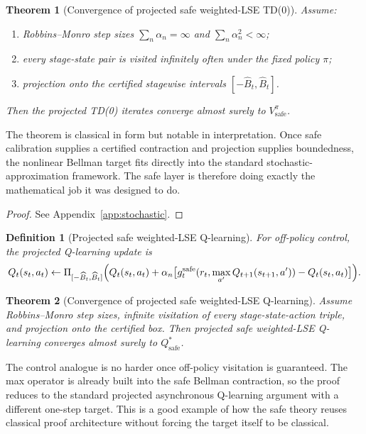 \documentclass{article}
\newtheorem{theorem}{Theorem}[section]
\newtheorem{definition}[definition]{Definition}
\theoremstyle{remark}
\newcommand{\safe}{\mathrm{safe}}
\newcommand{\Bhat}{\widehat B}
\begin{document}
\begin{theorem}[Convergence of projected safe weighted-LSE TD(0)]
\label{thm:td0-convergence}
Assume:
\begin{enumerate}[label=(\roman*),leftmargin=1.5em,itemsep=2pt]
    \item Robbins--Monro step sizes $\sum_n \alpha_n=\infty$ and $\sum_n \alpha_n^2<\infty$;
    \item every stage-state pair is visited infinitely often under the fixed policy $\pi$;
    \item projection onto the certified stagewise intervals $[-\Bhat_t,\Bhat_t]$.
\end{enumerate}
Then the projected TD(0) iterates converge almost surely to $V_\safe^\pi$.
\end{theorem}

The theorem is classical in form but notable in interpretation.
Once safe calibration supplies a certified contraction and projection supplies boundedness, the nonlinear Bellman target fits directly into the standard stochastic-approximation framework.
The safe layer is therefore doing exactly the mathematical job it was designed to do.

\begin{proof}
See Appendix~\ref{app:stochastic}.
\end{proof}

\begin{definition}[Projected safe weighted-LSE Q-learning]
\label{def:lse-q}
For off-policy control, the projected Q-learning update is
\begin{equation}
Q_t(s_t,a_t)
\leftarrow
\Pi_{[-\Bhat_t,\Bhat_t]}
\Bigl(Q_t(s_t,a_t) + \alpha_n\bigl[g_t^{\safe}(r_t,\max_{a'}Q_{t+1}(s_{t+1},a')) - Q_t(s_t,a_t)\bigr]\Bigr).
\label{eq:safe-q-update}
\end{equation}
\end{definition}

\begin{theorem}[Convergence of projected safe weighted-LSE Q-learning]
\label{thm:q-convergence}
Assume Robbins--Monro step sizes, infinite visitation of every stage-state-action triple, and projection onto the certified box.
Then projected safe weighted-LSE Q-learning converges almost surely to $Q_\safe^*$.
\end{theorem}

The control analogue is no harder once off-policy visitation is guaranteed.
The max operator is already built into the safe Bellman contraction, so the proof reduces to the standard projected asynchronous Q-learning argument with a different one-step target.
This is a good example of how the safe theory reuses classical proof architecture without forcing the target itself to be classical.
\end{document}
